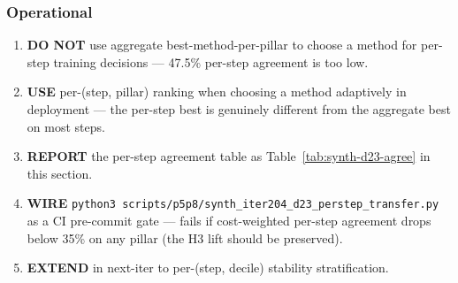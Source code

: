 \subsubsection{Operational}\label{sec:synth-d23-operational}
\begin{enumerate}
\item \textbf{DO NOT} use aggregate best-method-per-pillar to choose a
  method for per-step training decisions --- 47.5\% per-step agreement
  is too low.
\item \textbf{USE} per-(step, pillar) ranking when choosing a method
  adaptively in deployment --- the per-step best is genuinely different
  from the aggregate best on most steps.
\item \textbf{REPORT} the per-step agreement table as
  Table~\ref{tab:synth-d23-agree} in this section.
\item \textbf{WIRE} \texttt{python3 scripts/p5p8/synth\_iter204\_d23\_perstep\_transfer.py}
  as a CI pre-commit gate --- fails if cost-weighted per-step agreement
  drops below 35\% on any pillar (the H3 lift should be preserved).
\item \textbf{EXTEND} in next-iter to per-(step, decile) stability
  stratification.
\end{enumerate}
